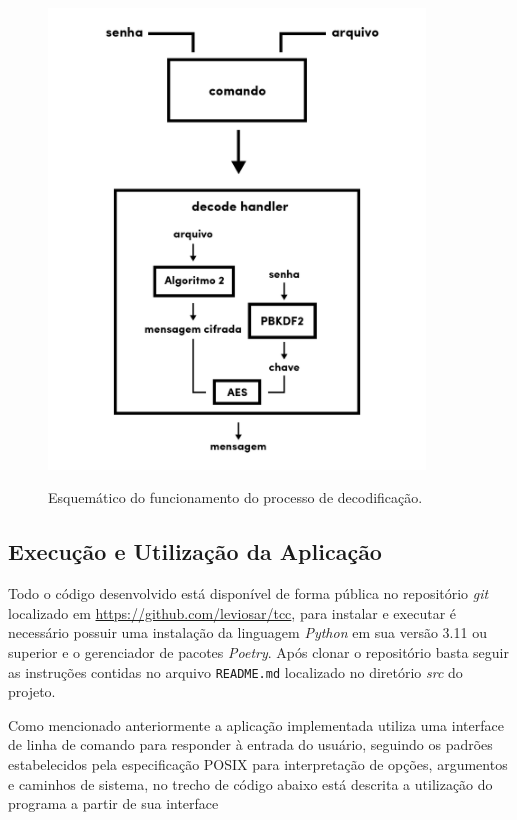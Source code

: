 \begin{figure}[!tb]
     \centering
     \caption{Esquemático do funcionamento do processo de decodificação.}
     \includegraphics[width=10cm]{images/TCC5.png}
     \label{fig:decode}
\end{figure}

\subsection{Execução e Utilização da Aplicação}

Todo o código desenvolvido está disponível de forma pública no repositório \textit{git} localizado em \href{https://github.com/leviosar/tcc}{https://github.com/leviosar/tcc}, para instalar e executar é necessário possuir uma instalação da linguagem \textit{Python} em sua versão 3.11 ou superior e o gerenciador de pacotes \textit{Poetry}. Após clonar o repositório basta seguir as instruções contidas no arquivo \texttt{README.md} localizado no diretório \textit{src} do projeto.

Como mencionado anteriormente a aplicação implementada utiliza uma interface de linha de comando para responder à entrada do usuário, seguindo os padrões estabelecidos pela especificação POSIX para interpretação de opções, argumentos e caminhos de sistema, no trecho de código abaixo está descrita a utilização do programa a partir de sua interface 

